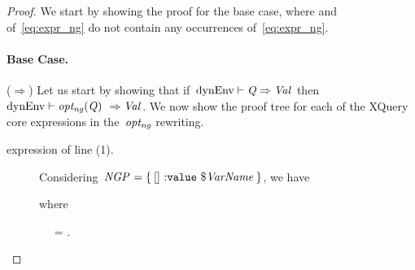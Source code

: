 \begin{proof}
  We start by showing the proof for the base case, where  and 
  of~\eqref{eq:expr_ng} do not contain any occurrences of~\eqref{eq:expr_ng}.
  \paragraph*{Base Case.}
  ($\Rightarrow$)
  Let us start by showing that if~${\textrm{dynEnv}} \vdash {\textit{\ensuremath{\mathit{{Q}_{}}}}} \Rightarrow \mathit{{Val}_{}}$ then~${\textrm{dynEnv}} \vdash \mathit{opt_{ng}}\!\left(\mathit{{Q}_{}}\right)$~$\Rightarrow \mathit{{Val}_{}}$.
  We now show the proof tree for each of the XQuery core expressions in the~$\mathit{opt_{ng}}$ rewriting.

\begin{description}

\item[\LET expression of line (1).]  Considering~$\mathit{{NGP}_{}} = \left\{\: \mathtt{[]~{:}value}~\$\mathit{VarName} \:\right\}$, we have

    \begin{prooftreefunction}
      
      
    \end{prooftreefunction}%
  where 
  \begin{tree}
    \ \  = \dyn {} \enspace .
    \label{tree:dynEvn3-ng}
  \end{tree}%


\end{description}
\end{proof}
